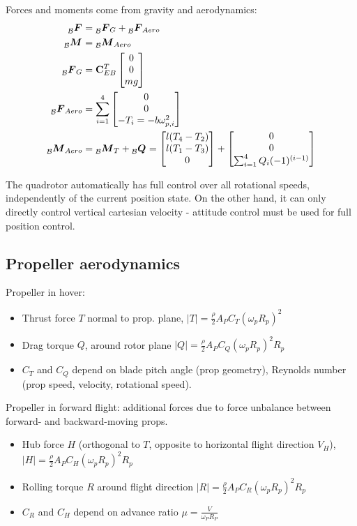 \documentclass[a4paper, 8pt]{extarticle}
\newcommand{\mvec}[3]{  \prescript{}{\mathcal{#1}}{\bm{#2}}  _{#3} }
\begin{document}
\begin{multicols*}{3}
Forces and moments come from gravity and aerodynamics:
\begin{align*}
\mvec{B}{F}{} &= \mvec{B}{F}{G} + \mvec{B}{F}{Aero} \\
\mvec{B}{M}{} &= \mvec{B}{M}{Aero} \\
\mvec{B}{F}{G} &= \mathbf{C}_{EB}^T \begin{bmatrix}
0 \\ 0 \\ mg
\end{bmatrix} \\
\mvec{B}{F}{Aero} &= \sum_{i=1}^4 \begin{bmatrix}
0 \\ 0 \\ -T_i = -b{\bf \omega}_{p,i}^2
\end{bmatrix}\\
\mvec{B}{M}{Aero} &= \mvec{B}{M}{T} + \mvec{B}{Q}{} = \begin{bmatrix}
l(T_4 - T_2) \\
l(T_1 - T_3) \\
0
\end{bmatrix} + \begin{bmatrix}
0 \\ 0 \\ \sum_{i=1}^4 Q_i(-1)^{(i-1)}
\end{bmatrix}
\end{align*}

The quadrotor automatically has full control over all rotational speeds, independently of the current position state. On the other hand, it can only directly control vertical cartesian velocity - attitude control must be used for full position control.


\subsection*{Propeller aerodynamics}
Propeller in hover:
\begin{itemize}
\item Thrust force $T$ normal to prop. plane, $|T| = \frac{\rho}{2} A_P C_T(\omega_p R_p)^2$
\item Drag torque $Q$, around rotor plane $|Q| = \frac{\rho}{2} A_P C_Q(\omega_p R_p)^2R_p$
\item $C_T$ and $C_Q$ depend on blade pitch angle (prop geometry), Reynolds number (prop speed, velocity, rotational speed).
\end{itemize}

Propeller in forward flight: additional forces due to force unbalance between forward- and backward-moving props.
\begin{itemize}
\item Hub force $H$ (orthogonal to $T$, opposite to horizontal flight direction $V_H$), $|H| = \frac{\rho}{2} A_P C_H(\omega_p R_p)^2R_p$
\item Rolling torque $R$ around flight direction $|R| = \frac{\rho}{2} A_P C_R(\omega_p R_p)^2R_p$
\item $C_R$ and $C_H$ depend on advance ratio $\mu = \frac{V}{\omega_P R_P}$
\end{itemize}


\end{multicols*}
\end{document}
